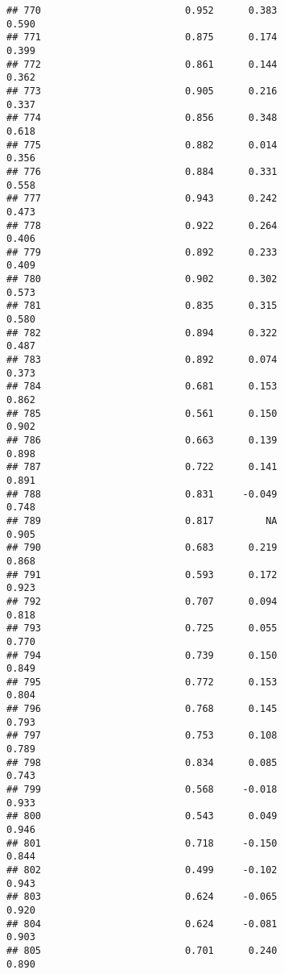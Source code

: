 \documentclass[
]{article}
\begin{document}
\begin{verbatim}
## 770                         0.952      0.383                     0.590
## 771                         0.875      0.174                     0.399
## 772                         0.861      0.144                     0.362
## 773                         0.905      0.216                     0.337
## 774                         0.856      0.348                     0.618
## 775                         0.882      0.014                     0.356
## 776                         0.884      0.331                     0.558
## 777                         0.943      0.242                     0.473
## 778                         0.922      0.264                     0.406
## 779                         0.892      0.233                     0.409
## 780                         0.902      0.302                     0.573
## 781                         0.835      0.315                     0.580
## 782                         0.894      0.322                     0.487
## 783                         0.892      0.074                     0.373
## 784                         0.681      0.153                     0.862
## 785                         0.561      0.150                     0.902
## 786                         0.663      0.139                     0.898
## 787                         0.722      0.141                     0.891
## 788                         0.831     -0.049                     0.748
## 789                         0.817         NA                     0.905
## 790                         0.683      0.219                     0.868
## 791                         0.593      0.172                     0.923
## 792                         0.707      0.094                     0.818
## 793                         0.725      0.055                     0.770
## 794                         0.739      0.150                     0.849
## 795                         0.772      0.153                     0.804
## 796                         0.768      0.145                     0.793
## 797                         0.753      0.108                     0.789
## 798                         0.834      0.085                     0.743
## 799                         0.568     -0.018                     0.933
## 800                         0.543      0.049                     0.946
## 801                         0.718     -0.150                     0.844
## 802                         0.499     -0.102                     0.943
## 803                         0.624     -0.065                     0.920
## 804                         0.624     -0.081                     0.903
## 805                         0.701      0.240                     0.890

\end{verbatim}
\end{document}
